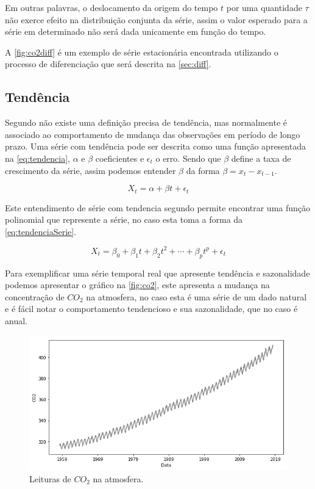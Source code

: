 \documentclass[
    12pt,
    oneside,
    a4paper,
    english,
    brazil
]{abntex2}
\begin{document}
Em outras palavras, o deslocamento da origem do tempo $t$ por uma quantidade 
$\tau$ não exerce efeito na distribuição conjunta da série, assim o valor 
esperado para a série em determinado não será dada unicamente em função do 
tempo.

A \autoref{fig:co2diff} é um exemplo de série estacionária encontrada utilizando 
o processo de diferenciação que será descrita na \autoref{sec:diff}.

\subsection{Tendência}

Segundo  não existe uma definição precisa de tendência, mas 
normalmente é associado ao comportamento de mudança das observações em período 
de longo prazo. Uma série com tendência pode ser descrita como uma função 
apresentada na \autoref{eq:tendencia}, $\alpha$ e $\beta{}$ coeficientes e 
$\epsilon{}_t$ o erro. Sendo que $\beta{}$ define a taxa de crescimento da 
série, assim podemos entender $\beta$ da forma $\beta = x_t - x_{t-1}$.

\begin{equation}
    \label{eq:tendencia}
    X_t = \alpha + \beta{}t + \epsilon{}_t
\end{equation}

Este entendimento de série com tendencia segundo  permite 
encontrar uma função polinomial que represente a série, no caso esta toma a 
forma da \autoref{eq:tendenciaSerie}.

\begin{equation}
    \label{eq:tendenciaSerie}
    X_t = \beta_0 + \beta_1t + \beta_2t^2 + \cdots + \beta_{p}t^p + \epsilon_t
\end{equation}

Para exemplificar uma série temporal real que apresente tendência e sazonalidade 
podemos apresentar o gráfico na \autoref{fig:co2}, este apresenta a mudança na 
concentração de $CO_2$ na atmosfera, no caso esta é uma série de um dado natural 
e é fácil notar o comportamento tendencioso e sua sazonalidade, que no caso é 
anual.

\begin{figure}
    \centering
    \caption{Leituras de $CO_2$ na atmosfera.}\label{fig:co2}
    \includegraphics[width=.6\linewidth]{images/co2.png}
\end{figure}
\end{document}
